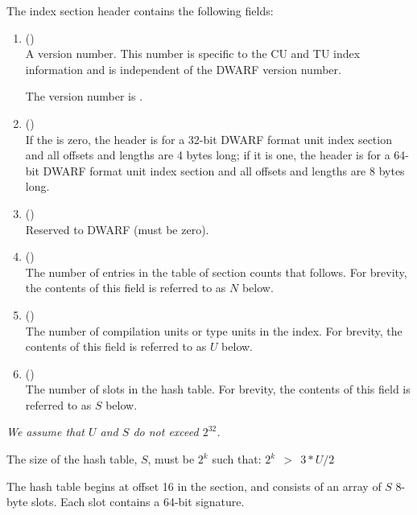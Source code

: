 The index section header contains the following fields:
\begin{enumerate}[1. ]
\item \HFNversion{} (\HFTuhalf) \\
A version number.
This number is specific to the CU and TU index information
and is independent of the DWARF version number.

The version number is \versiondotdebugcuindex.

\bb
\item \HFNoffsetsizeflag{} (\HFTuhalf) \\
If the \HFNoffsetsizeflag{} is zero, the header is for a 32-bit 
DWARF format unit index section and all offsets and lengths 
are 4 bytes long; if it is one, the header is for a 64-bit 
DWARF format unit index section and all offsets and lengths 
are 8 bytes long.
\eb

\item \HFNpadding{} (\HFTuhalf) \\
Reserved to DWARF (must be zero).

\item \HFNsectioncount{} (\HFTuword) \\
The number of entries in the table of section counts that follows.
For brevity, the contents of this field is referred to as $N$ below.

\item \HFNunitcount{} (\HFTuword) \\
The number of compilation units or type units in the index.
For brevity, the contents of this field is referred to as $U$ below.

\item \HFNslotcount{} (\HFTuword) \\
The number of slots in the hash table.
For brevity, the contents of this field is referred to as $S$ below.

\end{enumerate}

\textit{We assume that $U$ and $S$ do not exceed $2^{32}$.}

The size of the hash table, $S$, must be $2^k$ such that:
\hspace{0.3cm}$2^k\ \ >\ \ 3*U/2$

The hash table begins at offset 16 in the section, and consists
of an array of $S$ 8-byte slots. Each slot contains a 64-bit
signature.

